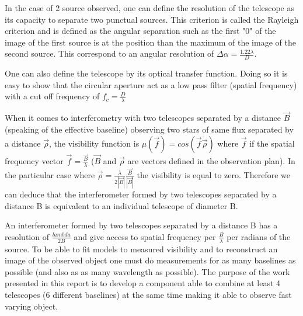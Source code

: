 In the case of 2 source observed, one can define the resolution of the telescope as its capacity to separate two punctual sources. This criterion is called the Rayleigh criterion and is defined as the angular separation such as the first "0" of the image of the first source is at the position than the maximum of the image of the second source. This correspond to an angular resolution of $\Delta \alpha = \frac{1.22\lambda}{D}$. 

One can also define the telescope by its optical transfer function. Doing so it is easy to show that the circular aperture act as a low pass filter (spatial frequency) with a cut off frequency of $f_c = \frac{D}{\lambda}$

When it comes to interferometry with two telescopes separated by a distance $\vec{B}$ (speaking of the effective baseline) observing two stars of same flux separated by a distance $\vec{\rho}$, the visibility function is $\mu(\vec{f})=cos(\vec{f}\dot\vec{\rho})$ where $\vec{f}$ if the spatial frequency vector $\vec{f} = \frac{\vec{B}}{\lambda}$ ($\vec{B}$ and $\vec{\rho}$ are vectors defined in the observation plan). In the particular case where $\vec{\rho}= \frac{\lambda}{2\left|\vec{B}\right|} \frac{\vec{B}}{\left|\vec{B}\right|}$ the visibility is equal to zero. Therefore we can deduce that the interferometer formed by two telescopes separated by a distance B is equivalent to an individual telescope of diameter B.  

An interferometer formed by two telescopes separated by a distance B has a resolution of $\frac{lambda}{2B}$ and give access to spatial frequency per $\frac{B}{\lambda}$ per radians of the source. To be able to fit models to measured visibility and to reconstruct an image of the observed object one must do measurements for as many baselines as possible (and also as as many wavelength as possible). The purpose of the work presented in this report is to develop a component able to combine at least 4 telescopes (6 different baselines) at the same time making it able to observe fast varying object.


